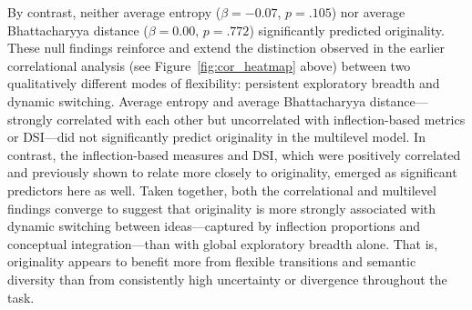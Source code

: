 \documentclass[../MA_Thesis.tex]{subfiles}
\begin{document}
By contrast, neither average entropy ($\beta = -0.07$, $p = .105$) nor average Bhattacharyya distance ($\beta = 0.00$, $p = .772$) significantly predicted originality. These null findings reinforce and extend the distinction observed in the earlier correlational analysis (see Figure~\ref{fig:cor_heatmap} above) between two qualitatively different modes of flexibility: persistent exploratory breadth and dynamic switching. Average entropy and average Bhattacharyya distance—strongly correlated with each other but uncorrelated with inflection-based metrics or DSI—did not significantly predict originality in the multilevel model. In contrast, the inflection-based measures and DSI, which were positively correlated and previously shown to relate more closely to originality, emerged as significant predictors here as well. Taken together, both the correlational and multilevel findings converge to suggest that originality is more strongly associated with dynamic switching between ideas—captured by inflection proportions and conceptual integration—than with global exploratory breadth alone. That is, originality appears to benefit more from flexible transitions and semantic diversity than from consistently high uncertainty or divergence throughout the task.
\end{document}
